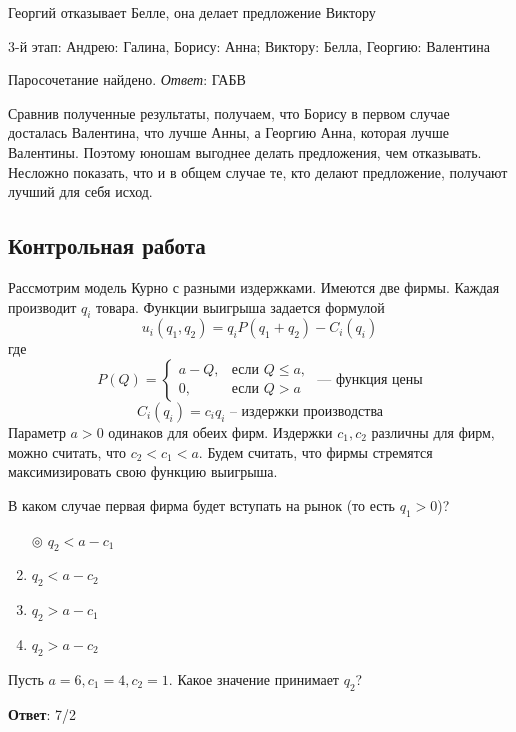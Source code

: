 	Георгий отказывает Белле, она делает предложение Виктору
	
	3-й этап: Андрею: Галина, Борису: Анна; Виктору: Белла, Георгию: Валентина
	
	Паросочетание найдено. \textit{Ответ}: ГАБВ
	
	Сравнив полученные результаты, получаем, что Борису в первом случае досталась Валентина, что лучше Анны, а Георгию Анна, которая лучше Валентины. Поэтому юношам выгоднее делать предложения, чем отказывать. Несложно показать, что и в общем случае те, кто делают предложение, получают лучший для себя исход.
	
	
	
	
	
	
	
\subsection{Контрольная работа}

\task
Рассмотрим модель Курно с разными издержками. Имеются две фирмы. Каждая производит $q_i$ товара. Функции выигрыша задается формулой
\[
	u_i (q_1, q_2) = q_i P(q_1 + q_2) - C_i (q_i)
\]
где
\[
P(Q) =
	\begin{cases}
	a - Q, & \text{если } Q \leq a, \\
	0, & \text{если } Q > a
	\end{cases} \text{ --- функция цены}
\]
\[
	C_i (q_i) = c_i q_i \text{ -- издержки производства}
\]
Параметр $a > 0$ одинаков для обеих фирм. Издержки $c_1, c_2$ различны для фирм, можно считать, что $c_2 < c_1 < a$. Будем считать, что фирмы стремятся максимизировать свою функцию выигрыша.

В каком случае первая фирма будет вступать на рынок (то есть $q_1 > 0$)?

\begin{enumerate}[label=$\circ$]
	\item[$\circledcirc$] $q_2 < a - c_1$
	\item $q_2 < a - c_2$
	\item $q_2 > a - c_1$
	\item $q_2 > a - c_2$
\end{enumerate}

\solution %

\task
Пусть $a = 6, c_1 = 4, c_2 = 1$. Какое значение принимает $q_2$?

\textbf{Ответ}: 
7/2

\solution %

